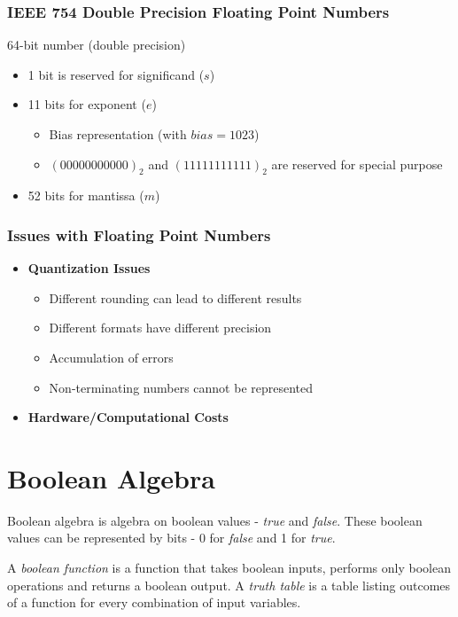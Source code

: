 \documentclass[oneside]{book}
\begin{document}
\subsection{IEEE 754 Double Precision Floating Point Numbers}
64-bit number (double precision)
\begin{itemize}
	\item 1 bit is reserved for significand ($s$)
	\item 11 bits for exponent ($e$)
	      \begin{itemize}
		      \item Bias representation (with $bias=1023$)
		      \item $(000 0000 0000)_2$ and $(111 1111 1111)_2$ are reserved for special purpose
	      \end{itemize}
	\item 52 bits for mantissa ($m$)
\end{itemize}

\subsection{Issues with Floating Point Numbers}
\begin{itemize}
	\item \textbf{Quantization Issues}
	      \begin{itemize}
		      \item Different rounding can lead to different results
		      \item Different formats have different precision
		      \item Accumulation of errors
		      \item Non-terminating numbers cannot be represented
	      \end{itemize}
	\item \textbf{Hardware/Computational Costs}
\end{itemize}

\chapter{Boolean Algebra}
Boolean algebra is algebra on boolean values - \textit{true} and \textit{false}.
These boolean values can be represented by bits - 0 for \textit{false} and 1 for \textit{true}.


\noindent A \textit{boolean function} is a function that takes boolean inputs, performs only boolean operations and returns a boolean output.
A \textit{truth table} is a table listing outcomes of a function for every combination of input variables.
\end{document}
